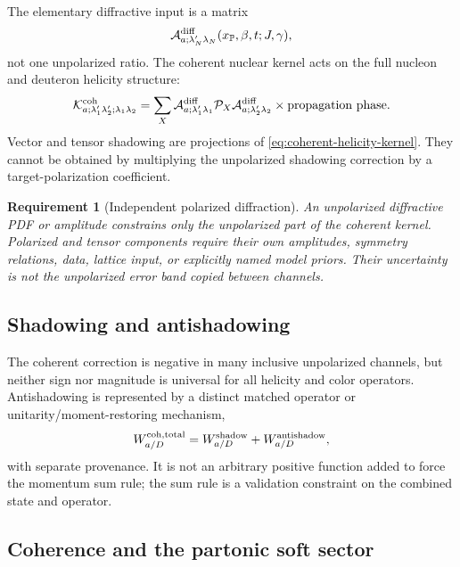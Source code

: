 \documentclass[11pt]{article}
\newtheorem{requirement}[definition]{Requirement}
\newcommand{\cK}{\mathcal K}
\newcommand{\cP}{\mathcal P}
\newcommand{\cA}{\mathcal A}
\newcommand{\coh}{\mathrm{coh}}
\begin{document}
The elementary diffractive input is a matrix
\begin{equation}
 \cA_{a;\lambda_N'\lambda_N}^{\rm diff}
 (x_{\mathbb P},\beta,t;J,\gamma),
\label{eq:helicity-diffractive-amplitude}
\end{equation}
not one unpolarized ratio.  The coherent nuclear kernel acts on the full
nucleon and deuteron helicity structure:
\begin{equation}
 \cK_{a;\lambda_1'\lambda_2';\lambda_1\lambda_2}^{\coh}
 =\sum_X
 \cA_{a;\lambda_1'\lambda_1}^{\rm diff}
 \cP_X
 \cA_{a;\lambda_2'\lambda_2}^{\rm diff}
 \times\text{propagation phase}.
\label{eq:coherent-helicity-kernel}
\end{equation}
Vector and tensor shadowing are projections of
\cref{eq:coherent-helicity-kernel}.  They cannot be obtained by multiplying
the unpolarized shadowing correction by a target-polarization coefficient.

\begin{requirement}[Independent polarized diffraction]
\label{req:independent-polarized-diffraction}
An unpolarized diffractive PDF or amplitude constrains only the unpolarized
part of the coherent kernel.  Polarized and tensor components require their
own amplitudes, symmetry relations, data, lattice input, or explicitly named
model priors.  Their uncertainty is not the unpolarized error band copied
between channels.
\end{requirement}

\subsection{Shadowing and antishadowing}

The coherent correction is negative in many inclusive unpolarized channels,
but neither sign nor magnitude is universal for all helicity and color
operators.  Antishadowing is represented by a distinct matched operator or
unitarity/moment-restoring mechanism,
\begin{equation}
 W_{a/D}^{\coh,\rm total}
 =W_{a/D}^{\rm shadow}
 +W_{a/D}^{\rm antishadow},
\label{eq:shadow-antishadow}
\end{equation}
with separate provenance.  It is not an arbitrary positive function added to
force the momentum sum rule; the sum rule is a validation constraint on the
combined state and operator.

\subsection{Coherence and the partonic soft sector}
\end{document}
